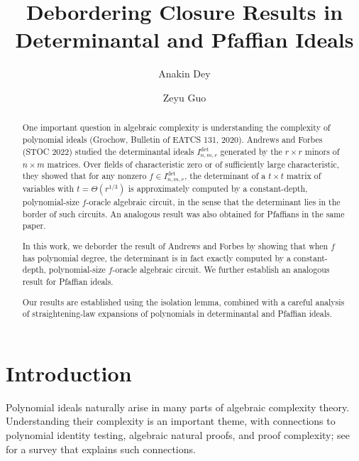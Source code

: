 \documentclass[letterpaper, 11pt]{amsart}
\title{Debordering Closure Results in Determinantal and Pfaffian Ideals}
\author{Anakin Dey}
\author{Zeyu Guo}
\begin{document}
\begin{abstract}
One important question in algebraic complexity is understanding the complexity of polynomial ideals (Grochow, Bulletin of EATCS 131, 2020).
Andrews and Forbes (STOC 2022) studied the determinantal ideals $I^{\det}_{n,m,r}$ generated by the $r\times r$ minors of $n\times m$ matrices.
Over fields of characteristic zero or of sufficiently large characteristic, they showed that for any nonzero $f \in I^{\det}_{n,m,r}$, the determinant of a $t \times t$ matrix of variables with $t = \Theta(r^{1/3})$ is approximately computed by a constant-depth, polynomial-size $f$-oracle algebraic circuit, in the sense that the determinant lies in the border of such circuits.
An analogous result was also obtained for Pfaffians in the same paper.

In this work, we deborder the result of Andrews and Forbes by showing that when $f$ has polynomial degree, the determinant is in fact exactly computed by a constant-depth, polynomial-size $f$-oracle algebraic circuit.
We further establish an analogous result for Pfaffian ideals.

Our results are established using the isolation lemma, combined with a careful analysis of straightening-law expansions of polynomials in determinantal and Pfaffian ideals.
\end{abstract}

\maketitle
\thispagestyle{empty}

\section{Introduction}\label{sec:intro}

Polynomial ideals naturally arise in many parts of algebraic complexity theory.
Understanding their complexity is an important theme, with connections to polynomial identity testing, algebraic natural proofs, and proof complexity; see~\cite{Grochow20} for a survey that explains such connections.
\end{document}
